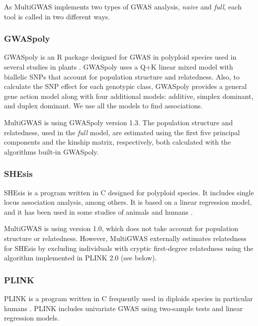 As MultiGWAS implements two types of GWAS analysis,  \emph{naive} and  \emph{full}, each tool is called in two different ways.

\subsubsection{GWASpoly}

GWASpoly \cite{Rosyara2016} is an R package designed for GWAS in polyploid species used in several studies in plants \cite{Berdugo2017,Ferrao2018,Sharma2018,Yuan2019}. GWASpoly uses a Q+K linear mixed model with biallelic SNPs that account for population structure and relatedness. Also, to calculate the SNP effect for each genotypic class, GWASpoly provides a general gene action model along with four additional models: additive, simplex dominant, and duplex dominant. We use all the models to find associations. %

MultiGWAS is using GWASpoly version 1.3. The population structure and relatedness, used in the \emph{full} model, are estimated using the first five principal components and the kinship matrix, respectively, both calculated with the algorithms built-in GWASpoly.  


\subsubsection{SHEsis}

SHEsis \cite{Shen2016} is a program written in C designed for polyploid species. It includes single locus association analysis, among others. It is based on a linear regression model, and it has been used in some studies of animals and humans \cite{Qiao2015,Meng2019}. 

MultiGWAS is using version 1.0, which does not take account for population structure or relatedness. However, MultiGWAS externally estimates relatedness for SHEsis by excluding individuals with cryptic first-degree relatedness using the algorithm implemented in PLINK 2.0 (see below).


\subsubsection{PLINK}

PLINK \cite{Purcell2007} is a program written in C frequently used in diploids species in particular humans \cite{Power2016}. PLINK includes univariate GWAS using two-sample tests and linear regression models.

